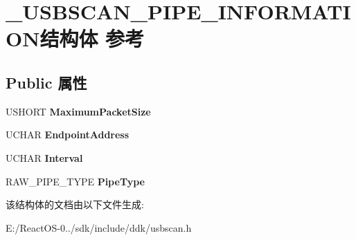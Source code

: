 \hypertarget{struct___u_s_b_s_c_a_n___p_i_p_e___i_n_f_o_r_m_a_t_i_o_n}{}\section{\+\_\+\+U\+S\+B\+S\+C\+A\+N\+\_\+\+P\+I\+P\+E\+\_\+\+I\+N\+F\+O\+R\+M\+A\+T\+I\+O\+N结构体 参考}
\label{struct___u_s_b_s_c_a_n___p_i_p_e___i_n_f_o_r_m_a_t_i_o_n}
\subsection*{Public 属性}
\begin{DoxyCompactItemize}
\item 
\mbox{\label{struct___u_s_b_s_c_a_n___p_i_p_e___i_n_f_o_r_m_a_t_i_o_n_a796723887cfbe89935d5750b6ccca8d4}} 
U\+S\+H\+O\+RT {\bfseries Maximum\+Packet\+Size}
\item 
\mbox{\label{struct___u_s_b_s_c_a_n___p_i_p_e___i_n_f_o_r_m_a_t_i_o_n_ad4599dcf924b25c24126b23345c09255}} 
U\+C\+H\+AR {\bfseries Endpoint\+Address}
\item 
\mbox{\label{struct___u_s_b_s_c_a_n___p_i_p_e___i_n_f_o_r_m_a_t_i_o_n_ad052e2d5c37f75a94d8762e0362ce780}} 
U\+C\+H\+AR {\bfseries Interval}
\item 
\mbox{\label{struct___u_s_b_s_c_a_n___p_i_p_e___i_n_f_o_r_m_a_t_i_o_n_a77cb59c9fbcefedaa43c5f4c7c614c4c}} 
R\+A\+W\+\_\+\+P\+I\+P\+E\+\_\+\+T\+Y\+PE {\bfseries Pipe\+Type}
\end{DoxyCompactItemize}


该结构体的文档由以下文件生成\+:\begin{DoxyCompactItemize}
\item 
E\+:/\+React\+O\+S-\/0../sdk/include/ddk/usbscan.\+h\end{DoxyCompactItemize}
